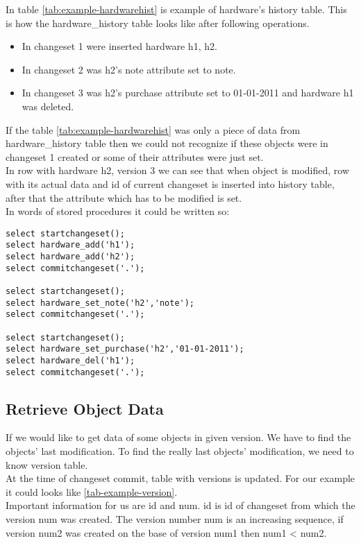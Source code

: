 \documentclass[deska]{subfiles}
\begin{document}
In table \ref{tab:example-hardwarehist} is example of hardware's history table. This is how the hardware\_history table looks like after following operations. 
\begin{itemize}
    \item In changeset 1 were inserted hardware h1, h2.
    \item In changeset 2 was h2's note attribute set to note.
    \item In changeset 3 was h2's purchase attribute set to 01-01-2011 and hardware h1 was deleted.
\end{itemize}


If the table \ref{tab:example-hardwarehist} was only a piece of data from hardware\_history table then we could not recognize if these objects were in changeset 1 created or some of their attributes were just set.\\
In row with hardware h2, version 3 we can see that when object is modified, row with its actual data and id of current changeset is inserted into history table, after that the attribute which has to be modified is set.\\
In words of stored procedures it could be written so:\\

\begin{verbatim}
select startchangeset();
select hardware_add('h1');
select hardware_add('h2');
select commitchangeset('.');

select startchangeset();
select hardware_set_note('h2','note');
select commitchangeset('.');

select startchangeset();
select hardware_set_purchase('h2','01-01-2011');
select hardware_del('h1');
select commitchangeset('.');
\end{verbatim}

\subsection{Retrieve Object Data}

If we would like to get data of some objects in given version. We have to find the objects' last modification. To find the really last objects' modification, we need to know version table.\\
At the time of changeset commit, table with versions is updated. For our example it could looks like \ref{tab-example-version}.\\
Important information for us are id and num. id is id of changeset from which the version num was created. The version number num is an increasing sequence, if version num2 was created on the base of version num1 then num1 < num2.
\end{document}
